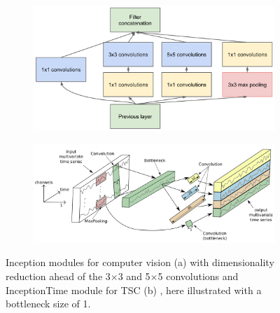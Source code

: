 

\begin{figure}
  \centering
  \begin{subfigure}[c]{0.6\textwidth}
    \includegraphics[width=\textwidth]{files/figs/inception-module-dimred.png}
    \caption{}
    \label{fig:inception-module}
  \end{subfigure}
  \begin{subfigure}[c]{0.6\textwidth}
    \includegraphics[width=\textwidth]{files/figs/inception-time-module.png}
    \caption{}
    \label{fig:inceptiontime-module}
  \end{subfigure}
  \caption{Inception modules for computer vision (a) \cite{Szegedy2015} with dimensionality reduction ahead of the 3$\times$3 and 5$\times$5 convolutions and InceptionTime module for TSC (b) \cite{IsmailFawaz2020}, here illustrated with a bottleneck size of 1.}
\end{figure}

